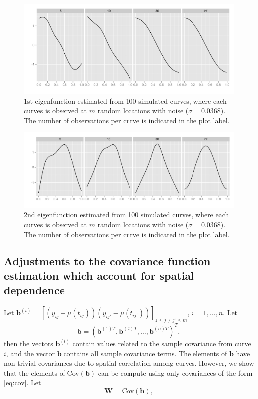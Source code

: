 \begin{figure}
	\includegraphics[width=
	\textwidth]{images/Ch3/eigenfun1-sig-0368.pdf} \caption{1st eigenfunction estimated from 100 simulated curves, where each curves is observed at $m$ random locations with noise ($\sigma = 0.0368$). The number of observations per curve is indicated in the plot label. } 
\end{figure}

\begin{figure}
	\includegraphics[width=
	\textwidth]{images/Ch3/eigenfun2-sig-0368.pdf} \caption{2nd eigenfunction estimated from 100 simulated curves, where each curves is observed at $m$ random locations with noise ($\sigma = 0.0368$). The number of observations per curve is indicated in the plot label. } 
\end{figure}

\newpage 
\subsection{Adjustments to the covariance function estimation which account for spatial dependence} \label{sec:adjustments to the covariance}

Let $\mathbf{b}^{(i)} = [(y_{ij}-\mu(t_{ij}))(y_{ij'}-\mu(t_{ij'}))]_{1\leq j\neq j'\leq m}$, $i=1, \dots, n$. Let
\[ \mathbf{b} = (\mathbf{b}^{(1)T}, \mathbf{b}^{(2)T}, \dots, \mathbf{b}^{(n)T} )^T, \]
then the vectors $\mathbf{b}^{(i)}$ contain values related to the sample covariance from curve $i$, and the vector $\mathbf{b}$ contains all sample covariance terms. The elements of $\mathbf{b}$ have non-trivial covariances due to spatial correlation among curves. However, we show that the elements of Cov$(\mathbf{b})$ can be compute using only covariances of the form \eqref{eq:cov}. Let
\[ \mathbf{W}= \text{Cov}(\mathbf{b}), \]


